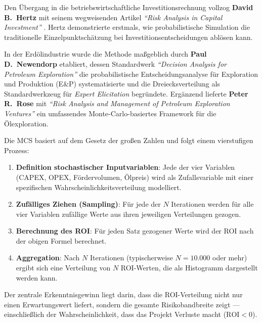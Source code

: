 \documentclass[11pt,a4paper]{article}
\begin{document}
Den Übergang in die betriebswirtschaftliche Investitionsrechnung vollzog \textbf{David B.~Hertz} mit seinem wegweisenden Artikel \textit{``Risk Analysis in Capital Investment''} \cite{hertz1964}. Hertz demonstrierte erstmals, wie probabilistische Simulation die traditionelle Einzelpunktschätzung bei Investitionsentscheidungen ablösen kann.

In der Erdölindustrie wurde die Methode maßgeblich durch \textbf{Paul D.~Newendorp} etabliert, dessen Standardwerk \textit{``Decision Analysis for Petroleum Exploration''} \cite{newendorp2000} die probabilistische Entscheidungsanalyse für Exploration und Produktion (E\&P) systematisierte und die Dreiecksverteilung als Standardwerkzeug für \textit{Expert Elicitation} begründete. Ergänzend lieferte \textbf{Peter R.~Rose} mit \textit{``Risk Analysis and Management of Petroleum Exploration Ventures''} \cite{rose2001} ein umfassendes Monte-Carlo-basiertes Framework für die Ölexploration.

Die MCS basiert auf dem Gesetz der großen Zahlen und folgt einem vierstufigen Prozess:

\begin{enumerate}[label=\arabic*., itemsep=4pt]
  \item \textbf{Definition stochastischer Inputvariablen}: Jede der vier Variablen (CAPEX, OPEX, Fördervolumen, Ölpreis) wird als Zufallsvariable mit einer spezifischen Wahrscheinlichkeitsverteilung modelliert.
  \item \textbf{Zufälliges Ziehen (Sampling)}: Für jede der $N$ Iterationen werden für alle vier Variablen zufällige Werte aus ihren jeweiligen Verteilungen gezogen.
  \item \textbf{Berechnung des ROI}: Für jeden Satz gezogener Werte wird der ROI nach der obigen Formel berechnet.
  \item \textbf{Aggregation}: Nach $N$ Iterationen (typischerweise $N = 10.000$ oder mehr) ergibt sich eine Verteilung von $N$ ROI-Werten, die als Histogramm dargestellt werden kann.
\end{enumerate}

Der zentrale Erkenntnisgewinn liegt darin, dass die ROI-Verteilung nicht nur einen Erwartungswert liefert, sondern die gesamte Risikobandbreite zeigt — einschließlich der Wahrscheinlichkeit, dass das Projekt Verluste macht ($\text{ROI} < 0$).

\end{document}
